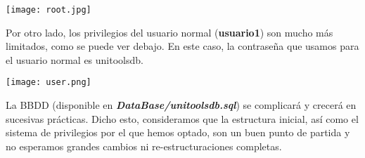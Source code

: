 \documentclass[12pt]{report}
\begin{document}
\texttt{[image: root.jpg]}

Por otro lado, los privilegios del usuario normal (\textbf{usuario1}) son mucho más limitados, como se puede ver debajo. En este caso, la contraseña que usamos para el usuario normal es unitoolsdb.

\texttt{[image: user.png]}

La BBDD (disponible en \textbf{\textit{DataBase/unitoolsdb.sql}}) se complicará y crecerá en sucesivas prácticas. Dicho esto, consideramos que la estructura inicial, así como el sistema de privilegios por el que hemos optado, son un buen punto de partida y no esperamos grandes cambios ni re-estructuraciones completas.
\end{document}
